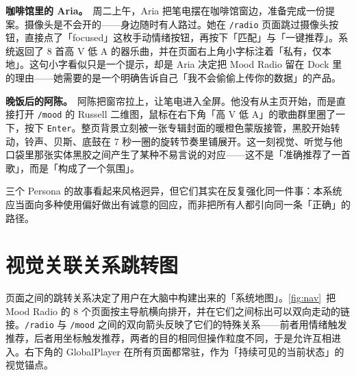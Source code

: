 \textbf{咖啡馆里的 Aria。}~周二上午，Aria 把笔电摆在咖啡馆窗边，准备完成一份提案。摄像头是不会开的——身边随时有人路过。她在 \texttt{/radio} 页面跳过摄像头按钮，直接点了「focused」这枚手动情绪按钮，再按下「匹配」与「一键推荐」。系统返回了 8 首高 V 低 A 的器乐曲，并在页面右上角小字标注着「私有，仅本地」。这句小字看似只是一个提示，却是 Aria 决定把 Mood Radio 留在 Dock 里的理由——她需要的是一个明确告诉自己「我不会偷偷上传你的数据」的产品。

\textbf{晚饭后的阿陈。}~阿陈把窗帘拉上，让笔电进入全屏。他没有从主页开始，而是直接打开 \texttt{/mood} 的 Russell 二维图，鼠标在右下角「高 V 低 A」的歌曲群里圈了一下，按下 \texttt{Enter}。整页背景立刻被一张专辑封面的暖橙色蒙版接管，黑胶开始转动，铃声、贝斯、底鼓在 7 秒一圈的旋转节奏里铺展开。这一刻视觉、听觉与他口袋里那张实体黑胶之间产生了某种不易言说的对应——这不是「准确推荐了一首歌」，而是「构成了一个氛围」。

三个 Persona 的故事看起来风格迥异，但它们其实在反复强化同一件事：本系统应当面向多种使用偏好做出有诚意的回应，而非把所有人都引向同一条「正确」的路径。

\section{视觉关联关系跳转图}

页面之间的跳转关系决定了用户在大脑中构建出来的「系统地图」。\cref{fig:nav}~把 Mood Radio 的 8 个页面按主导航横向排开，并在它们之间标出可以双向走动的链接。\texttt{/radio} 与 \texttt{/mood} 之间的双向箭头反映了它们的特殊关系——前者用情绪触发推荐，后者用坐标触发推荐，两者的目的相同但操作粒度不同，于是允许互相进入。右下角的 GlobalPlayer 在所有页面都常驻，作为「持续可见的当前状态」的视觉锚点。


